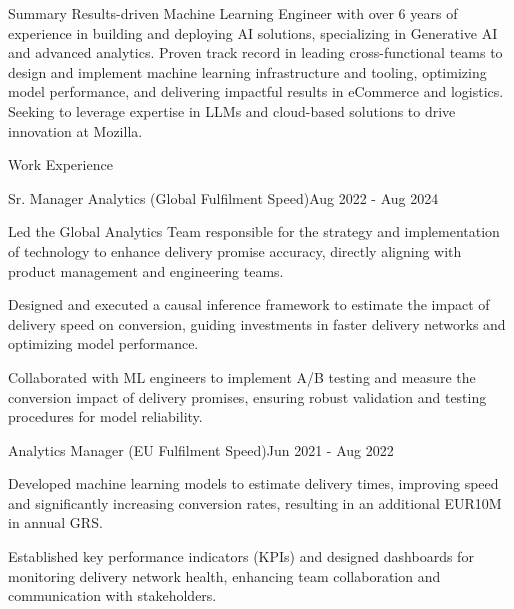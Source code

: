 \documentclass{resume} %
\begin{document}
\begin{rSection}{Summary}
    Results-driven Machine Learning Engineer with over 6 years of experience in building and deploying AI solutions, specializing in Generative AI and advanced analytics. Proven track record in leading cross-functional teams to design and implement machine learning infrastructure and tooling, optimizing model performance, and delivering impactful results in eCommerce and logistics. Seeking to leverage expertise in LLMs and cloud-based solutions to drive innovation at Mozilla.
\end{rSection}

    \begin{rSection}{Work Experience}
                    \begin{rSubsection}
                {Sr. Manager Analytics (Global Fulfilment Speed)}{Aug 2022 - Aug 2024}
                {}
                {}
                                    \item Led the Global Analytics Team responsible for the strategy and implementation of technology to enhance delivery promise accuracy, directly aligning with product management and engineering teams.
                                    \item Designed and executed a causal inference framework to estimate the impact of delivery speed on conversion, guiding investments in faster delivery networks and optimizing model performance.
                                    \item Collaborated with ML engineers to implement A/B testing and measure the conversion impact of delivery promises, ensuring robust validation and testing procedures for model reliability.
                            \end{rSubsection}
                    \begin{rSubsection}
                {Analytics Manager (EU Fulfilment Speed)}{Jun 2021 - Aug 2022}
                {}
                {}
                                    \item Developed machine learning models to estimate delivery times, improving speed and significantly increasing conversion rates, resulting in an additional EUR10M in annual GRS.
                                    \item Established key performance indicators (KPIs) and designed dashboards for monitoring delivery network health, enhancing team collaboration and communication with stakeholders.

\end{rSubsection}
\end{rSection}
\end{document}
